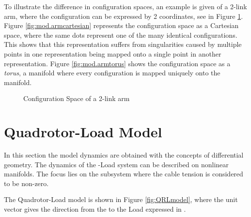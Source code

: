 To illustrate the difference in configuration spaces, an example is given of a 2-link arm, where the configuration can be expressed by 2 coordinates, see in Figure \ref{fig:mod.armmanifold}. Figure \ref{fig:mod.armcartesian} represents the configuration space as a Cartesian space, where the same dots represent one of the many identical configurations. This shows that this representation suffers from singularities caused by multiple points in one representation being mapped onto a single point in another representation. Figure \ref{fig:mod.armtorus} shows the configuration space as a \textit{torus}, a manifold where every configuration is mapped uniquely onto the manifold.
\begin{figure}[h!]
	\centering
	\caption{Configuration Space of a 2-link arm\label{fig:mod.armmanifold}}
\end{figure}		

\section{Quadrotor-Load Model}	\label{sec:mod.QRLmod}

In this section the model dynamics are obtained with the concepts of differential geometry. The dynamics of the -Load system can be described on nonlinear manifolds. The focus lies on the subsystem where the cable tension is considered to be non-zero. 

The Quadrotor-Load model is shown in Figure \ref{fig:QRLmodel}, where the unit vector  gives the direction from the  to the Load expressed in \BF.

